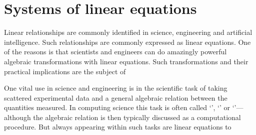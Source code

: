 
\chapter{Systems of linear equations}
\label{ch:sle}

\minitoc
{}


Linear relationships are commonly identified in science, engineering and artificial intelligence.
Such relationships are commonly expressed as linear equations.
One of the reasons is that scientists and engineers can do amazingly powerful algebraic transformations with linear equations.
Such transformations and their practical implications are the subject of 

One vital use in science and engineering is in the scientific task of taking scattered experimental data and  a general algebraic relation between the quantities measured.
In computing science this task is often called `', `' or `'---although  the algebraic relation is then typically discussed as a computational procedure.
But always appearing within such tasks are linear equations to 

